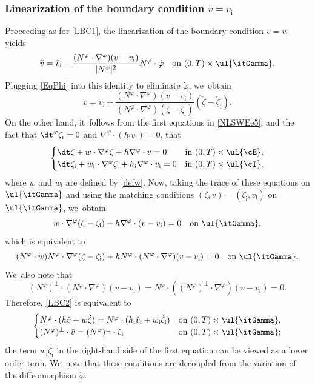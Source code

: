 \subsubsection{Linearization of the boundary condition $v=v_\mathrm{i}$}
Proceeding as for \eqref{LBC1}, the linearization of the boundary condition $v=v_\mathrm{i}$ yields
\[
\check{v}=\check{v}_\mathrm{i}-\frac{(N^\varphi\cdot\nabla^\varphi)(v-v_\mathrm{i})}{|N^\varphi|^2} N^\varphi\cdot\dot{\varphi}
\quad\text{on } (0,T)\times\ul{\itGamma}.
\]
Plugging \eqref{EqPhi} into this identity to eliminate $\dot{\varphi}$, we~obtain
\begin{equation}\label{LBC2}
\check{v} = \check{v}_\mathrm{i}
+ \frac{(N^\varphi\cdot\nabla^\varphi)(v-v_\mathrm{i})}{(N^\varphi\cdot\nabla^\varphi)(\zeta-\zeta_\mathrm{i})} (\check{\zeta}-\check{\zeta}_\mathrm{i}).
\end{equation}
On the other hand, it~follows from the first equations in \eqref{NLSWEe5},
and the fact that $\dt^\varphi\zeta_\mathrm{i}=0$ and $\nabla^\varphi\cdot(h_\mathrm{i}v_\mathrm{i})=0$, that
\[
\begin{cases}
\dt\zeta+w\cdot\nabla^\varphi\zeta+h\nabla^\varphi\cdot v=0 &\text{in } (0,T)\times\ul{\cE}, \\
\dt\zeta_\mathrm{i}+w_\mathrm{i}\cdot\nabla^\varphi\zeta_\mathrm{i}+h_\mathrm{i}\nabla^\varphi\cdot v_\mathrm{i}=0 &\text{in } (0,T)\times\ul{\cI},
\end{cases}
\]
where $w$ and $w_\mathrm{i}$ are defined by \eqref{defw}.
Now, taking the trace of these equations on $\ul{\itGamma}$ and using the matching conditions $(\zeta,v)=(\zeta_\mathrm{i},v_\mathrm{i})$ on $\ul{\itGamma}$, we~obtain
\[
w\cdot\nabla^\varphi(\zeta-\zeta_\mathrm{i})+h\nabla^\varphi\cdot(v-v_\mathrm{i})=0\quad \text{on }\ul{\itGamma},
\]
which is equivalent to
\[
(N^\varphi\cdot w)N^\varphi\cdot\nabla^\varphi(\zeta-\zeta_\mathrm{i})+hN^\varphi\cdot(N^\varphi\cdot\nabla^\varphi)(v-v_\mathrm{i})=0\quad \text{on }\ul{\itGamma}.
\]
We~also note that
\[
(N^\varphi)^\perp\cdot(N^\varphi\cdot\nabla^\varphi)(v-v_\mathrm{i})=N^\varphi\cdot((N^\varphi)^\perp\cdot\nabla^\varphi)(v-v_\mathrm{i})=0.
\]
Therefore, \eqref{LBC2} is equivalent to
\begin{equation}\label{LBC3}
\begin{cases}
N^\varphi\cdot(h\check{v}+w\check{\zeta})=N^\varphi\cdot(h_\mathrm{i}\check{v}_\mathrm{i}+w_\mathrm{i}\check{\zeta}_\mathrm{i}) &\text{on } (0,T)\times\ul{\itGamma}, \\
(N^\varphi)^\perp\cdot\check{v}=(N^\varphi)^\perp\cdot\check{v}_\mathrm{i} &\text{on } (0,T)\times\ul{\itGamma};
\end{cases}
\end{equation}
the term $w_\mathrm{i}\check{\zeta}_\mathrm{i}$ in the right-hand side of the first equation can be viewed as a lower order term. We~note that these conditions are decoupled from the variation of the diffeomorphism $\dot{\varphi}$.


